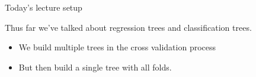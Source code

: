 \documentclass[mathserif, aspectratio=169]{beamer}
\begin{document}
\begin{frame}{Today's lecture setup}

Thus far we've talked about regression trees and classification trees.
\begin{itemize}
\item We build multiple trees in the cross validation process
\item But then build a single tree with all folds.
\end{itemize}



\end{frame}
\end{document}
